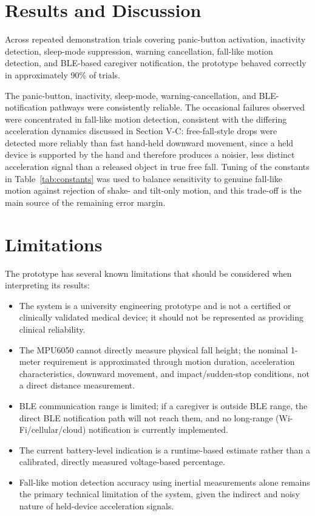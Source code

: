 \documentclass[lettersize,journal]{IEEEtran}
\begin{document}
\section{Results and Discussion}
Across repeated demonstration trials covering panic-button activation, inactivity detection, sleep-mode suppression, warning cancellation, fall-like motion detection, and BLE-based caregiver notification, the prototype behaved correctly in approximately 90\% of trials. 

The panic-button, inactivity, sleep-mode, warning-cancellation, and BLE-notification pathways were consistently reliable. The occasional failures observed were concentrated in fall-like motion detection, consistent with the differing acceleration dynamics discussed in Section V-C: free-fall-style drops were detected more reliably than fast hand-held downward movement, since a held device is supported by the hand and therefore produces a noisier, less distinct acceleration signal than a released object in true free fall. Tuning of the constants in Table~\ref{tab:constants} was used to balance sensitivity to genuine fall-like motion against rejection of shake- and tilt-only motion, and this trade-off is the main source of the remaining error margin.

\section{Limitations}
The prototype has several known limitations that should be considered when interpreting its results:
\begin{itemize}
\item The system is a university engineering prototype and is not a certified or clinically validated medical device; it should not be represented as providing clinical reliability.
\item The MPU6050 cannot directly measure physical fall height; the nominal 1-meter requirement is approximated through motion duration, acceleration characteristics, downward movement, and impact/sudden-stop conditions, not a direct distance measurement.
\item BLE communication range is limited; if a caregiver is outside BLE range, the direct BLE notification path will not reach them, and no long-range (Wi-Fi/cellular/cloud) notification is currently implemented.
\item The current battery-level indication is a runtime-based estimate rather than a calibrated, directly measured voltage-based percentage.
\item Fall-like motion detection accuracy using inertial measurements alone remains the primary technical limitation of the system, given the indirect and noisy nature of held-device acceleration signals.
\end{itemize}
\end{document}
